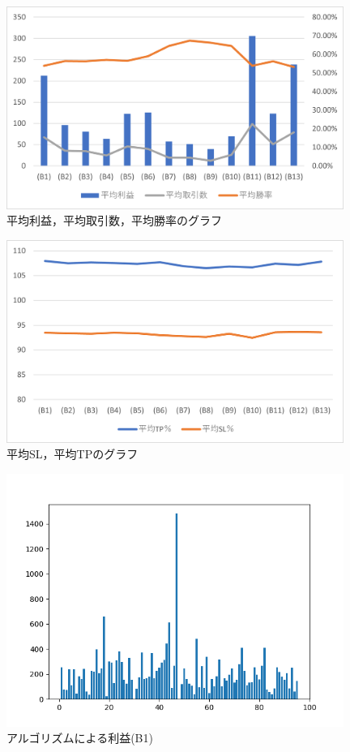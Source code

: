 \begin{figure}[H]
  \centering
  \includegraphics[width=110mm]{fig/res_1.png}
  \caption{平均利益，平均取引数，平均勝率のグラフ}
  \label{fig:res1}
 \end{figure}

 \begin{figure}[H]
  \centering
  \includegraphics[width=110mm]{fig/res_2.png}
  \caption{平均SL，平均TPのグラフ}
  \label{fig:res2}
 \end{figure}

  \begin{figure}[H]
  \centering
  \includegraphics[width=110mm]{fig/macdonly_saiteki.png}
  \caption{アルゴリズムによる利益(B1)}
  \label{fig:macdonysai}
 \end{figure}

